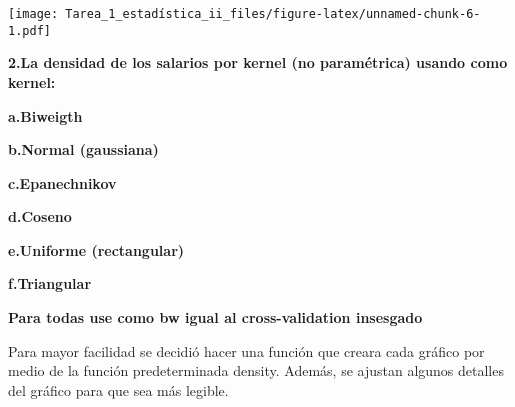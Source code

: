 \documentclass[
]{article}
\begin{document}
\texttt{[image: Tarea\_1\_estadística\_ii\_files/figure-latex/unnamed-chunk-6-1.pdf]}

\textbf{2.La densidad de los salarios por kernel (no paramétrica) usando
como kernel:}

\textbf{a.Biweigth}

\textbf{b.Normal (gaussiana)}

\textbf{c.Epanechnikov}

\textbf{d.Coseno}

\textbf{e.Uniforme (rectangular)}

\textbf{f.Triangular}

\textbf{Para todas use como bw igual al cross-validation insesgado}

Para mayor facilidad se decidió hacer una función que creara cada
gráfico por medio de la función predeterminada density. Además, se
ajustan algunos detalles del gráfico para que sea más legible.
\end{document}
